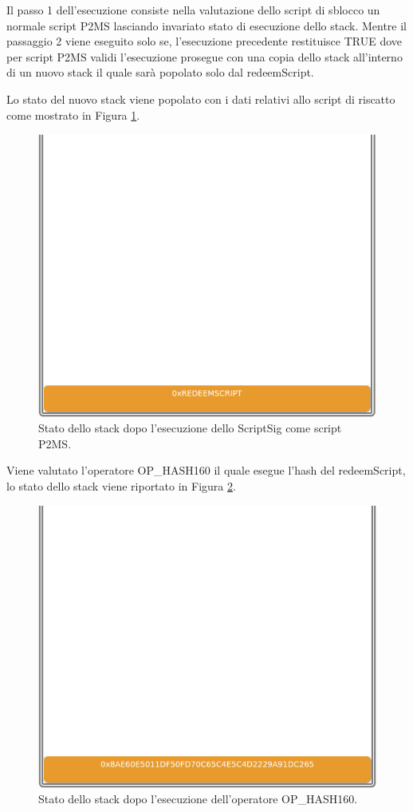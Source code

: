 Il passo 1 dell’esecuzione consiste nella valutazione dello script di sblocco un normale script P2MS lasciando invariato stato di esecuzione dello stack.
Mentre il passaggio 2 viene eseguito solo se, l’esecuzione precedente restituisce TRUE dove per script P2MS validi l’esecuzione prosegue con una copia dello stack all’interno di un nuovo stack il quale sarà popolato solo dal redeemScript.

Lo stato del nuovo stack viene popolato con i dati relativi allo script di riscatto come mostrato in Figura \ref{fig:stackp2sh01}.

\begin{figure}[H]
\begin{center}
\includegraphics[width=0.6\columnwidth]{images/script/p2sh/1.png}
\end{center}
\caption{Stato dello stack dopo l’esecuzione dello ScriptSig come script P2MS.}
\label{fig:stackp2sh01}
\end{figure}

Viene valutato l’operatore OP\_HASH160 il quale esegue l’hash del redeemScript, lo stato dello stack viene riportato in Figura \ref{fig:stackp2sh02}.
\begin{figure}[H]
\begin{center}
\includegraphics[width=0.6\columnwidth]{images/script/p2sh/2.png}
\end{center}
\caption{Stato dello stack dopo l’esecuzione dell’operatore OP\_HASH160.}
\label{fig:stackp2sh02}
\end{figure}

